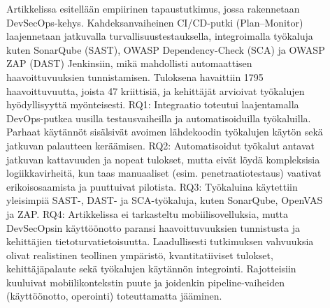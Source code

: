 \documentclass[bscthesis,finnish,oneside,biblatex]{uefcsthesis}
\begin{document}
    \begin{description}
        \item[\cite{feio2024_empirical}] Artikkelissa esitellään empiirinen tapaustutkimus, jossa rakennetaan DevSecOps-kehys. Kahdeksanvaiheinen CI/CD-putki (Plan–Monitor) laajennetaan jatkuvalla turvallisuustestauksella, integroimalla työkaluja kuten SonarQube (SAST), OWASP Dependency-Check (SCA) ja OWASP ZAP (DAST) Jenkinsiin, mikä mahdollisti automaattisen haavoittuvuuksien tunnistamisen. Tuloksena havaittiin 1795 haavoittuvuutta, joista 47 kriittisiä, ja kehittäjät arvioivat työkalujen hyödyllisyyttä myönteisesti. RQ1: Integraatio toteutui laajentamalla DevOps-putkea uusilla testausvaiheilla ja automatisoiduilla työkaluilla. Parhaat käytännöt sisälsivät avoimen lähdekoodin työkalujen käytön sekä jatkuvan palautteen keräämisen. RQ2: Automatisoidut työkalut antavat jatkuvan kattavuuden ja nopeat tulokset, mutta eivät löydä kompleksisia logiikkavirheitä, kun taas manuaaliset (esim. penetraatiotestaus) vaativat erikoisosaamista ja puuttuivat pilotista. RQ3: Työkaluina käytettiin yleisimpiä SAST-, DAST- ja SCA-työkaluja, kuten SonarQube, OpenVAS ja ZAP. RQ4: Artikkelissa ei tarkasteltu mobiilisovelluksia, mutta DevSecOpsin käyttöönotto paransi haavoittuvuuksien tunnistusta ja kehittäjien tietoturvatietoisuutta. Laadullisesti tutkimuksen vahvuuksia olivat realistinen teollinen ympäristö, kvantitatiiviset tulokset, kehittäjäpalaute sekä työkalujen käytännön integrointi. Rajotteisiin kuuluivat mobiilikontekstin puute ja joidenkin pipeline-vaiheiden (käyttöönotto, operointi) toteuttamatta jääminen.
    \end{description}
\end{document}
